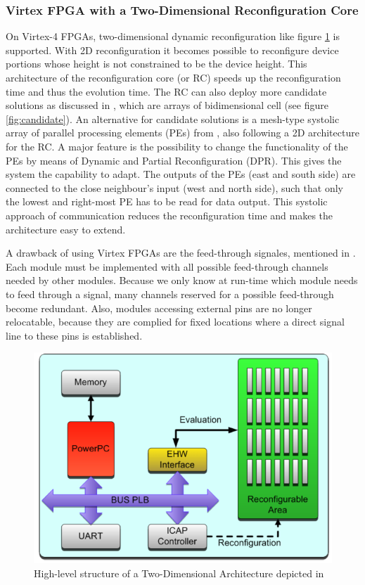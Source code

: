 
\subsubsection{Virtex FPGA with a Two-Dimensional Reconfiguration Core}
\label{sec:fpga}
On Virtex-4 FPGAs, two-dimensional dynamic reconfiguration like figure \ref{fig:2d} is supported. With 2D reconfiguration it becomes possible to reconfigure device portions whose height is not constrained to be the device height. This architecture of the reconfiguration core (or RC) speeds up the reconfiguration time and thus the evolution time.  The RC can also deploy more candidate solutions as discussed in \cite{virtex4}, which are arrays of bidimensional cell (see figure \ref{fig:candidate}). An alternative for candidate solutions is a mesh-type systolic array of parallel processing elements (PEs) from \cite{dpr}, also following a 2D architecture for the RC. A major feature is the possibility to change the functionality of the PEs by means of Dynamic and Partial Reconfiguration (DPR). This gives the system the capability to adapt. The outputs of the PEs (east and south side) are connected to the close neighbour's input (west and north side), such that only the lowest and right-most PE has to be read for data output. This systolic approach of communication reduces the reconfiguration time and makes the architecture easy to extend.

A drawback of using Virtex FPGAs are the feed-through signales, mentioned in \cite{erlangen}. Each module must be implemented with all possible feed-through channels  needed by other modules. Because we only know at run-time which module needs to feed through a signal, many channels reserved for a possible feed-through become redundant. Also, modules accessing external pins are no longer relocatable, because they are complied for fixed locations where a direct signal line to these pins is established.

\begin{figure}[htb]%
\includegraphics[width=\columnwidth]{Pictures/2D_architecture.png}%
\caption{High-level structure of a Two-Dimensional Architecture depicted in \cite{virtex4}}%
\label{fig:2d}%
\end{figure}

